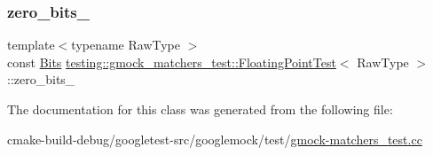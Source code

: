 \mbox{\label{classtesting_1_1gmock__matchers__test_1_1FloatingPointTest_afb9b6beb1f152693155cf7db4e1fc4d2}} 
\subsubsection{\texorpdfstring{zero\_bits\_}{zero\_bits\_}}
{\footnotesize\ttfamily template$<$typename Raw\+Type $>$ \\
const \mbox{\hyperlink{classtesting_1_1gmock__matchers__test_1_1FloatingPointTest_addf899bd832ae51103198d201d2f2ea2}{Bits}} \mbox{\hyperlink{classtesting_1_1gmock__matchers__test_1_1FloatingPointTest}{testing\+::gmock\+\_\+matchers\+\_\+test\+::\+Floating\+Point\+Test}}$<$ Raw\+Type $>$\+::zero\+\_\+bits\+\_\+\hspace{0.3cm}{\ttfamily [protected]}}



The documentation for this class was generated from the following file\+:\begin{DoxyCompactItemize}
\item 
cmake-\/build-\/debug/googletest-\/src/googlemock/test/\mbox{\hyperlink{gmock-matchers__test_8cc}{gmock-\/matchers\+\_\+test.\+cc}}\end{DoxyCompactItemize}
